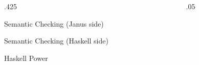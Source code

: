 \documentclass[final,hyperref={pdfpagelabels=false}]{beamer}
\newcommand\sepsize{.05\textwidth}
\newcommand\colsize{.425\textwidth}
\begin{document}
\begin{frame}[t]
\begin{columns}[t]
\begin{column}{\colsize} %


\begin{block}{Semantic Checking (Janus side)}
\end{block}

\begin{block}{Semantic Checking (Haskell side)}
\end{block}

\begin{block}{Haskell Power}
\end{block}


\end{column} %

\begin{column}{\sepsize}\end{column} %

\end{columns} %

\end{frame} %
\end{document}
